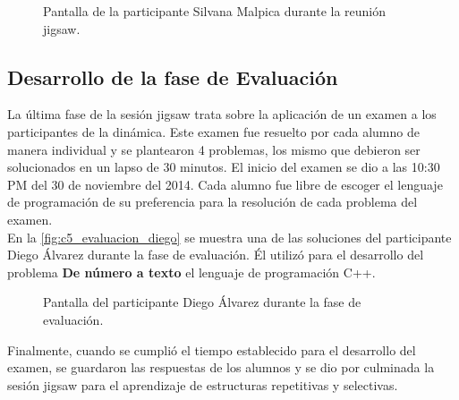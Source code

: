 \begin{figure}
	\centering
	\caption[Reunión Jigsaw - Silvana Malpica]{Pantalla de la participante Silvana Malpica durante la reunión jigsaw.}
	\label{fig:c5_reunion_jigsaw_silvana}
\end{figure}

\subsection{Desarrollo de la fase de Evaluación}
La última fase de la sesión jigsaw trata sobre la aplicación de un examen a los participantes de la dinámica. Este examen fue resuelto por cada alumno de manera individual y se plantearon 4 problemas, los mismo que debieron ser solucionados en un lapso de 30 minutos. El inicio del examen se dio a las 10:30 PM del 30 de noviembre del 2014. Cada alumno fue libre de escoger el lenguaje de programación de su preferencia para la resolución de cada problema del examen.\\

En la \autoref{fig:c5_evaluacion_diego} se muestra una de las soluciones del participante Diego Álvarez durante la fase de evaluación. Él utilizó para el desarrollo del problema \textbf{De número a texto} el lenguaje de programación C++.\\

\begin{figure}
	\centering
	\caption[Evaluación - Diego Álvarez]{Pantalla del participante Diego Álvarez durante la fase de evaluación.}
	\label{fig:c5_evaluacion_diego}
\end{figure}

Finalmente, cuando se cumplió el tiempo establecido para el desarrollo del examen, se guardaron las respuestas de los alumnos y se dio por culminada la sesión jigsaw para el aprendizaje de estructuras repetitivas y selectivas.
